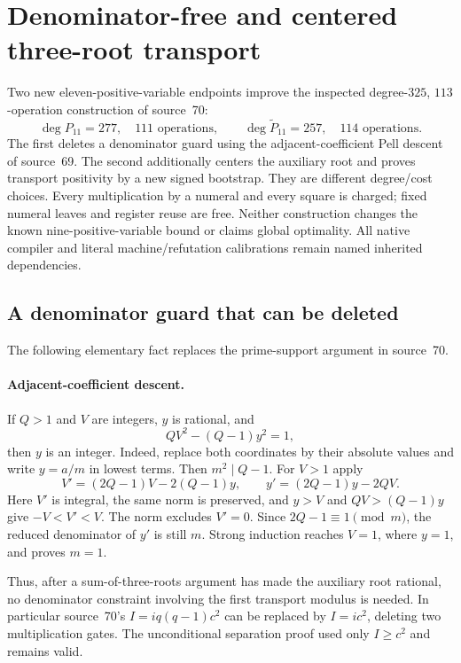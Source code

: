 \section{Denominator-free and centered three-root transport}
\label{sec:pell-three-root}

Two new eleven-positive-variable endpoints improve the inspected
degree-$325$, $113$-operation construction of source~70:
\[
 \boxed{\deg P_{11}=277,\quad 111\text{ operations}},\qquad
 \boxed{\deg \widetilde P_{11}=257,\quad 114\text{ operations}}.
\]
The first deletes a denominator guard using the adjacent-coefficient
Pell descent of source~69.  The second additionally centers the auxiliary
root and proves transport positivity by a new signed bootstrap.  They are
different degree/cost choices.  Every multiplication by a numeral and every
square is charged; fixed numeral leaves and register reuse are free.
Neither construction changes the known nine-positive-variable bound or
claims global optimality.  All native compiler and literal
machine/refutation calibrations remain named inherited dependencies.

\subsection{A denominator guard that can be deleted}

The following elementary fact replaces the prime-support argument in
source~70.

\paragraph{Adjacent-coefficient descent.}
If $Q>1$ and $V$ are integers, $y$ is rational, and
\[
 QV^2-(Q-1)y^2=1,
\]
then $y$ is an integer.  Indeed, replace both coordinates by their
absolute values and write $y=a/m$ in lowest terms.  Then $m^2\mid Q-1$.
For $V>1$ apply
\[
 V'=(2Q-1)V-2(Q-1)y,\qquad
 y'=(2Q-1)y-2QV.
\]
Here $V'$ is integral, the same norm is preserved, and $y>V$ and
$QV>(Q-1)y$ give $-V<V'<V$.  The norm excludes $V'=0$.
Since $2Q-1\equiv1\pmod m$, the reduced denominator of $y'$ is still
$m$.  Strong induction reaches $V=1$, where $y=1$, and proves $m=1$.

Thus, after a sum-of-three-roots argument has made the auxiliary root
rational, no denominator constraint involving the first transport modulus
is needed.  In particular source~70's $I=iq(q-1)c^2$ can be replaced by
$I=ic^2$, deleting two multiplication gates.  The unconditional separation
proof used only $I\ge c^2$ and remains valid.

